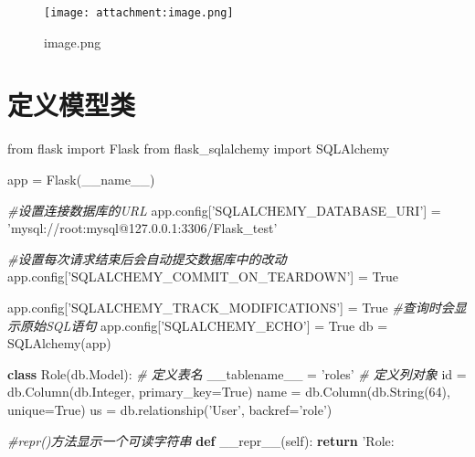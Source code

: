 \documentclass[11pt]{article}
\makeatletter
\def\maxwidth{\ifdim\Gin@nat@width>\linewidth\linewidth
    \else\Gin@nat@width\fi}
\let\Oldincludegraphics\includegraphics
\renewcommand{\includegraphics}[1]{\Oldincludegraphics[width=.8\maxwidth]{#1}}
\newenvironment{Shaded}{}{}
\newcommand{\KeywordTok}[1]{\textcolor[rgb]{0.00,0.44,0.13}{\textbf{{#1}}}}
\newcommand{\DecValTok}[1]{\textcolor[rgb]{0.25,0.63,0.44}{{#1}}}
\newcommand{\StringTok}[1]{\textcolor[rgb]{0.25,0.44,0.63}{{#1}}}
\newcommand{\CommentTok}[1]{\textcolor[rgb]{0.38,0.63,0.69}{\textit{{#1}}}}
\newcommand{\FunctionTok}[1]{\textcolor[rgb]{0.02,0.16,0.49}{{#1}}}
\newcommand{\NormalTok}[1]{{#1}}
\newcommand{\SpecialCharTok}[1]{\textcolor[rgb]{0.25,0.44,0.63}{{#1}}}
\newcommand{\ImportTok}[1]{{#1}}
\newcommand{\VariableTok}[1]{\textcolor[rgb]{0.10,0.09,0.49}{{#1}}}
\newcommand{\ControlFlowTok}[1]{\textcolor[rgb]{0.00,0.44,0.13}{\textbf{{#1}}}}
\newcommand{\OperatorTok}[1]{\textcolor[rgb]{0.40,0.40,0.40}{{#1}}}
\newcommand{\BuiltInTok}[1]{{#1}}
\makeatother
\begin{document}
\begin{figure}
\centering
\texttt{[image: attachment:image.png]}
\caption{image.png}
\end{figure}

    \hypertarget{ux5b9aux4e49ux6a21ux578bux7c7b}{%
\section{定义模型类}\label{ux5b9aux4e49ux6a21ux578bux7c7b}}

\begin{Shaded}
\begin{Highlighting}[]
\ImportTok{from}\NormalTok{ flask }\ImportTok{import}\NormalTok{ Flask}
\ImportTok{from}\NormalTok{ flask_sqlalchemy }\ImportTok{import}\NormalTok{ SQLAlchemy}


\NormalTok{app }\OperatorTok{=}\NormalTok{ Flask(}\VariableTok{__name__}\NormalTok{)}

\CommentTok{#设置连接数据库的URL}
\NormalTok{app.config[}\StringTok{'SQLALCHEMY_DATABASE_URI'}\NormalTok{] }\OperatorTok{=} \StringTok{'mysql://root:mysql@127.0.0.1:3306/Flask_test'}

\CommentTok{#设置每次请求结束后会自动提交数据库中的改动}
\NormalTok{app.config[}\StringTok{'SQLALCHEMY_COMMIT_ON_TEARDOWN'}\NormalTok{] }\OperatorTok{=} \VariableTok{True}

\NormalTok{app.config[}\StringTok{'SQLALCHEMY_TRACK_MODIFICATIONS'}\NormalTok{] }\OperatorTok{=} \VariableTok{True}
\CommentTok{#查询时会显示原始SQL语句}
\NormalTok{app.config[}\StringTok{'SQLALCHEMY_ECHO'}\NormalTok{] }\OperatorTok{=} \VariableTok{True}
\NormalTok{db }\OperatorTok{=}\NormalTok{ SQLAlchemy(app)}

\KeywordTok{class}\NormalTok{ Role(db.Model):}
    \CommentTok{# 定义表名}
\NormalTok{    __tablename__ }\OperatorTok{=} \StringTok{'roles'}
    \CommentTok{# 定义列对象}
    \BuiltInTok{id} \OperatorTok{=}\NormalTok{ db.Column(db.Integer, primary_key}\OperatorTok{=}\VariableTok{True}\NormalTok{)}
\NormalTok{    name }\OperatorTok{=}\NormalTok{ db.Column(db.String(}\DecValTok{64}\NormalTok{), unique}\OperatorTok{=}\VariableTok{True}\NormalTok{)}
\NormalTok{    us }\OperatorTok{=}\NormalTok{ db.relationship(}\StringTok{'User'}\NormalTok{, backref}\OperatorTok{=}\StringTok{'role'}\NormalTok{)}

    \CommentTok{#repr()方法显示一个可读字符串}
    \KeywordTok{def} \FunctionTok{__repr__}\NormalTok{(}\VariableTok{self}\NormalTok{):}
        \ControlFlowTok{return} \StringTok{'Role:}\SpecialCharTok{%s}\StringTok{'}\OperatorTok{%} \VariableTok{self}\NormalTok{.name}

}
\end{Highlighting}
\end{Shaded}
\end{document}
